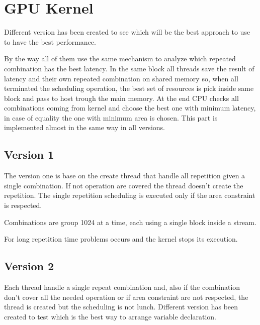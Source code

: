 \section{GPU Kernel}

Different version has been created to see which will be the best approach to use to have the best performance.

By the way all of them use the same mechanism to analyze which repeated combination has the best latency. In the same block all threads save the result of latency and their own repeated combination on shared memory so, when all terminated the scheduling operation, the best set of resources is pick inside same block and pass to host trough the main memory. At the end CPU checks all combinations coming from kernel and choose the best one with minimum latency, in case of equality the one with minimum area is chosen. This part is implemented almost in the same way in all versions.

\subsection{Version 1}

The version one is base on the create thread that handle all repetition given a single combination. If not operation are covered the thread doesn't create the repetition. The single repetition scheduling is executed only if the area constraint is respected.

Combinations are group 1024 at a time, each using a single block inside a stream.

For long repetition time problems occurs and the kernel stops its execution.

\subsection{Version 2}

Each thread handle a single repeat combination and, also if the combination don't cover all the needed operation or if area constraint are not respected, the thread is created but the scheduling is not lunch. Different version has been created to test which is the best way to arrange variable declaration.

